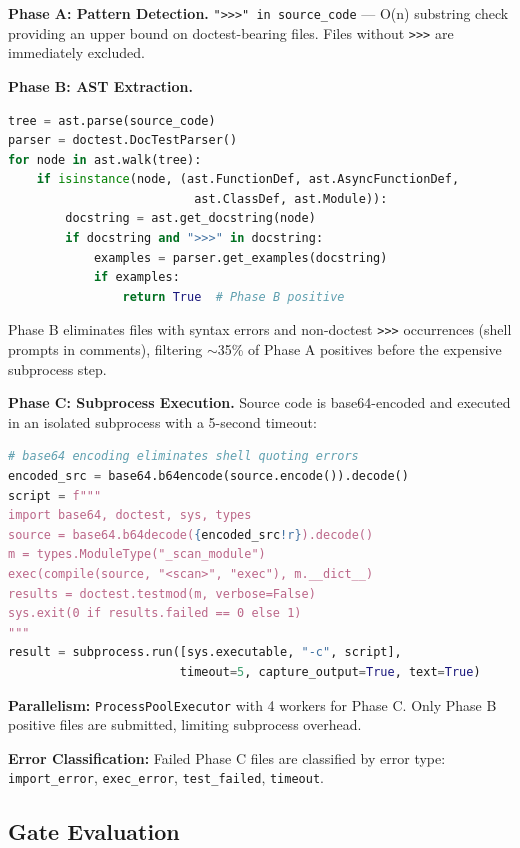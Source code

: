 \textbf{Phase A: Pattern Detection.} \texttt{">>>" in source\_code} --- O(n) substring check
providing an upper bound on doctest-bearing files. Files without \texttt{>>>} are immediately excluded.

\textbf{Phase B: AST Extraction.}

\begin{lstlisting}[language=Python]
tree = ast.parse(source_code)
parser = doctest.DocTestParser()
for node in ast.walk(tree):
    if isinstance(node, (ast.FunctionDef, ast.AsyncFunctionDef,
                          ast.ClassDef, ast.Module)):
        docstring = ast.get_docstring(node)
        if docstring and ">>>" in docstring:
            examples = parser.get_examples(docstring)
            if examples:
                return True  # Phase B positive
\end{lstlisting}

Phase B eliminates files with syntax errors and non-doctest \texttt{>>>} occurrences (shell
prompts in comments), filtering $\sim$35\% of Phase A positives before the expensive subprocess step.

\textbf{Phase C: Subprocess Execution.} Source code is base64-encoded and executed in an
isolated subprocess with a 5-second timeout:

\begin{lstlisting}[language=Python]
# base64 encoding eliminates shell quoting errors
encoded_src = base64.b64encode(source.encode()).decode()
script = f"""
import base64, doctest, sys, types
source = base64.b64decode({encoded_src!r}).decode()
m = types.ModuleType("_scan_module")
exec(compile(source, "<scan>", "exec"), m.__dict__)
results = doctest.testmod(m, verbose=False)
sys.exit(0 if results.failed == 0 else 1)
"""
result = subprocess.run([sys.executable, "-c", script],
                        timeout=5, capture_output=True, text=True)
\end{lstlisting}

\textbf{Parallelism:} \texttt{ProcessPoolExecutor} with 4 workers for Phase C. Only Phase B
positive files are submitted, limiting subprocess overhead.

\textbf{Error Classification:} Failed Phase C files are classified by error type:
\texttt{import\_error}, \texttt{exec\_error}, \texttt{test\_failed}, \texttt{timeout}.

\subsection{Gate Evaluation}

